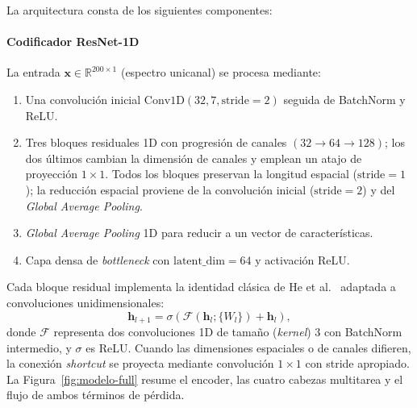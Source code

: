 \documentclass[sigconf,ACM]{acmart}
\begin{document}
La arquitectura consta de los siguientes componentes:

\paragraph{Codificador ResNet-1D} La entrada $\mathbf{x} \in \mathbb{R}^{200 \times 1}$ (espectro unicanal) se procesa mediante:
\begin{enumerate}
  \item Una convolución inicial $\mathrm{Conv1D}(32, 7, \text{stride}=2)$ seguida de BatchNorm y ReLU.
  \item Tres bloques residuales 1D con progresión de canales $(32 \to 64 \to 128)$; los dos últimos cambian la dimensión de canales y emplean un atajo de proyección $1\times1$. Todos los bloques preservan la longitud espacial ($\text{stride}=1$); la reducción espacial proviene de la convolución inicial ($\text{stride}=2$) y del \emph{Global Average Pooling}.
  \item \emph{Global Average Pooling} 1D para reducir a un vector de características.
  \item Capa densa de \emph{bottleneck} con $\mathrm{latent\_dim}=64$ y activación ReLU.
\end{enumerate}

Cada bloque residual implementa la identidad clásica de He et al.~\cite{He2016} adaptada a convoluciones unidimensionales:
\begin{equation}
  \mathbf{h}_{l+1} = \sigma\left( \mathcal{F}(\mathbf{h}_l; \{W_l\}) + \mathbf{h}_l \right),
  \label{eq:residual}
\end{equation}
donde $\mathcal{F}$ representa dos convoluciones 1D de tamaño (\emph{kernel}) $3$ con BatchNorm intermedio, y $\sigma$ es ReLU. Cuando las dimensiones espaciales o de canales difieren, la conexión \emph{shortcut} se proyecta mediante convolución $1\times1$ con stride apropiado. La Figura~\ref{fig:modelo-full} resume el encoder, las cuatro cabezas multitarea y el flujo de ambos términos de pérdida.
\end{document}
